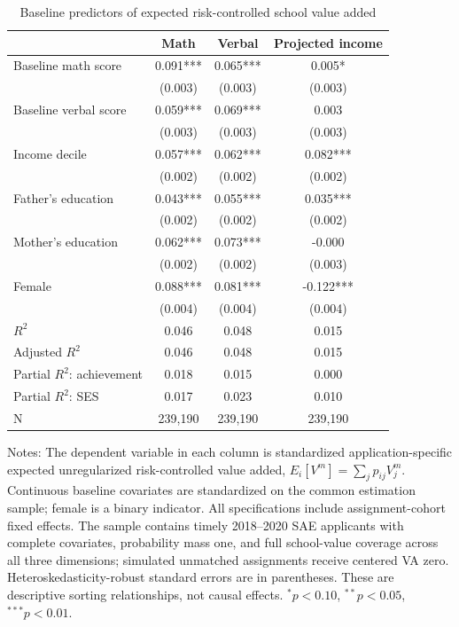 \begin{table}[!htbp]
\centering
\caption{Baseline predictors of expected risk-controlled school value added}
\label{tab:expected-rc-vam-sorting}
\begin{threeparttable}
\begin{tabular}{lccc}
\toprule
 & Math & Verbal & Projected income \\
\midrule
Baseline math score & 0.091*** & 0.065*** & 0.005* \\
 & (0.003) & (0.003) & (0.003) \\
Baseline verbal score & 0.059*** & 0.069*** & 0.003 \\
 & (0.003) & (0.003) & (0.003) \\
Income decile & 0.057*** & 0.062*** & 0.082*** \\
 & (0.002) & (0.002) & (0.002) \\
Father's education & 0.043*** & 0.055*** & 0.035*** \\
 & (0.002) & (0.002) & (0.002) \\
Mother's education & 0.062*** & 0.073*** & -0.000 \\
 & (0.002) & (0.002) & (0.003) \\
Female & 0.088*** & 0.081*** & -0.122*** \\
 & (0.004) & (0.004) & (0.004) \\
\midrule
$R^2$ & 0.046 & 0.048 & 0.015 \\
Adjusted $R^2$ & 0.046 & 0.048 & 0.015 \\
Partial $R^2$: achievement & 0.018 & 0.015 & 0.000 \\
Partial $R^2$: SES & 0.017 & 0.023 & 0.010 \\
N & 239,190 & 239,190 & 239,190 \\
\bottomrule
\end{tabular}
\begin{tablenotes}[flushleft]
\footnotesize
\item Notes: The dependent variable in each column is standardized application-specific expected unregularized risk-controlled value added, $E_i[V^m]=\sum_jp_{ij}V_j^m$. Continuous baseline covariates are standardized on the common estimation sample; female is a binary indicator. All specifications include assignment-cohort fixed effects. The sample contains timely 2018--2020 SAE applicants with complete covariates, probability mass one, and full school-value coverage across all three dimensions; simulated unmatched assignments receive centered VA zero. Heteroskedasticity-robust standard errors are in parentheses. These are descriptive sorting relationships, not causal effects. $^{*}p<0.10$, $^{**}p<0.05$, $^{***}p<0.01$.
\end{tablenotes}
\end{threeparttable}
\end{table}
